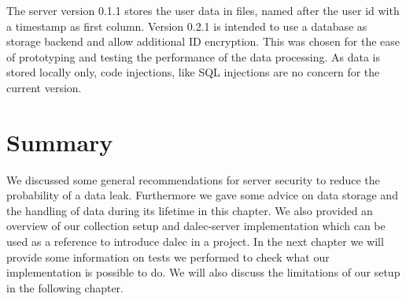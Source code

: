         The server version 0.1.1 stores the user data in files, named after the user id with a timestamp as first column. Version 0.2.1 is intended to use a database as storage backend and allow additional ID encryption. This was chosen for the ease of prototyping and testing the performance of the data processing.
        As data is stored locally only, code injections, like SQL injections are no concern for the current version. 
        
%
\section{Summary}
We discussed some general recommendations for server security to reduce the probability of a data leak. Furthermore we gave some advice on data storage and the handling of data during its lifetime in this chapter. We also provided an overview of our collection setup and dalec-server implementation which can be used as a reference to introduce dalec in a project. In the next chapter we will provide some information on tests we performed to check what our implementation is possible to do. We will also discuss the limitations of our setup in the following chapter.

%
